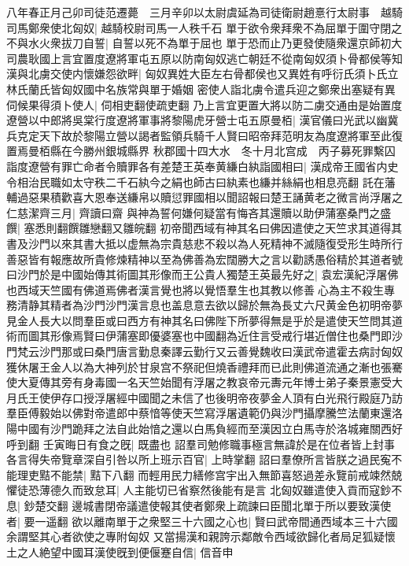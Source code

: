 八年春正月己卯司徒范遷薨　三月辛卯以太尉虞延為司徒衛尉趙憙行太尉事　越騎司馬鄭衆使北匈奴|{
	越騎校尉司馬一人秩千石}
單于欲令衆拜衆不為屈單于圍守閉之不與水火衆拔刀自誓|{
	自誓以死不為單于屈也}
單于恐而止乃更發使隨衆還京師初大司農耿國上言宜置度遼將軍屯五原以防南匈奴逃亡朝廷不從南匈奴須卜骨都侯等知漢與北虜交使内懷嫌怨欲畔|{
	匈奴異姓大臣左右骨都侯也又異姓有呼衍氏須卜氏立林氏蘭氏皆匈奴國中名族常與單于婚姻}
密使人詣北虜令遣兵迎之鄭衆出塞疑有異伺候果得須卜使人|{
	伺相吏翻使疏吏翻}
乃上言宜更置大將以防二虜交通由是始置度遼營以中郎將吳棠行度遼將軍事將黎陽虎牙營士屯五原曼栢|{
	漢官儀曰光武以幽冀兵克定天下故於黎陽立營以謁者監領兵騎千人賢曰昭帝拜范明友為度遼將軍至此復置焉曼栢縣在今勝州銀城縣界}
秋郡國十四大水　冬十月北宫成　丙子募死罪繫囚詣度遼營有罪亡命者令贖罪各有差楚王英奉黄縑白紈詣國相曰|{
	漢成帝王國省内史令相治民職如太守秩二千石紈今之絹也師古曰紈素也縑并絲絹也相息亮翻}
託在藩輔過惡果積歡喜大恩奉送縑帛以贖愆罪國相以聞詔報曰楚王誦黄老之微言尚浮屠之仁慈潔齊三月|{
	齊讀曰齋}
與神為誓何嫌何疑當有悔吝其還贖以助伊蒲塞桑門之盛饌|{
	塞悉則翻饌雛戀翻又雛皖翻}
初帝聞西域有神其名曰佛因遣使之天竺求其道得其書及沙門以來其書大抵以虚無為宗貴慈悲不殺以為人死精神不滅隨復受形生時所行善惡皆有報應故所貴修煉精神以至為佛善為宏闊勝大之言以勸誘愚俗精於其道者號曰沙門於是中國始傳其術圖其形像而王公貴人獨楚王英最先好之|{
	袁宏漢紀浮屠佛也西域天竺國有佛道焉佛者漢言覺也將以覺悟羣生也其教以修善心為主不殺生專務清静其精者為沙門沙門漢言息也盖息意去欲以歸於無為長丈六尺黄金色初明帝夢見金人長大以問羣臣或曰西方有神其名曰佛陛下所夢得無是乎於是遣使天竺問其道術而圖其形像焉賢曰伊蒲塞即優婆塞也中國翻為近住言受戒行堪近僧住也桑門即沙門梵云沙門那或曰桑門唐言勤息秦譯云勤行又云善覺魏收曰漢武帝遣霍去病討匈奴獲休屠王金人以為大神列於甘泉宫不祭祀但燒香禮拜而已此則佛道流通之漸也張騫使大夏傳其旁有身毒國一名天竺始聞有浮屠之教哀帝元夀元年博士弟子秦景憲受大月氏王使伊存口授浮屠經中國聞之未信了也後明帝夜夢金人頂有白光飛行殿庭乃訪羣臣傅毅始以佛對帝遣郎中蔡愔等使天竺寫浮屠遺範仍與沙門攝摩騰竺法蘭東還洛陽中國有沙門跪拜之法自此始愔之還以白馬負經而至漢因立白馬寺於洛城雍關西好呼到翻}
壬寅晦日有食之旣|{
	既盡也}
詔羣司勉修職事極言無諱於是在位者皆上封事各言得失帝覽章深自引咎以所上班示百官|{
	上時掌翻}
詔曰羣僚所言皆朕之過民寃不能理吏黠不能禁|{
	黠下八翻}
而輕用民力繕修宫宇出入無節喜怒過差永覽前戒竦然兢懼徒恐薄德久而致怠耳|{
	人主能切已省察然後能有是言}
北匈奴雖遣使入貢而寇鈔不息|{
	鈔楚交翻}
邊城書閉帝議遣使報其使者鄭衆上疏諫曰臣聞北單于所以要致漢使者|{
	要一遥翻}
欲以離南單于之衆堅三十六國之心也|{
	賢曰武帝間通西域本三十六國余謂堅其心者欲使之專附匈奴}
又當揚漢和親誇示鄰敵令西域欲歸化者局足狐疑懷土之人絶望中國耳漢使旣到便偃蹇自信|{
	信音申}
